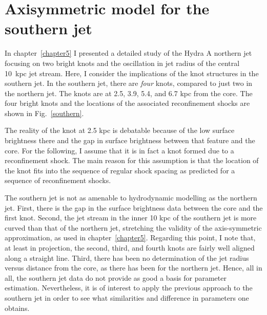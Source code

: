 \chapter{Axisymmetric model for the southern jet}
\label{chapter8}


In chapter~\ref{chapter5} I presented a detailed study of the Hydra A northern jet focusing on two bright knots and the oscillation in jet radius of the central 10~kpc jet stream. Here, I consider the implications of the knot structures in the southern jet. In the southern jet, there are \emph{four} knots, compared to just two in the northern jet. The knots are at 2.5, 3.9, 5.4, and 6.7 kpc from the core. The four bright knots and the locations of the associated reconfinement shocks are shown in Fig.~\ref{southern}.

The reality of the knot at 2.5 kpc is debatable because of the low surface brightness there and the gap in surface brightness between that feature and the core. For the following, I assume that it is in fact a knot formed due to a reconfinement shock. The main reason for this assumption is that the location of the knot fits into the sequence of regular shock spacing as predicted for a sequence of reconfinement shocks.

The southern jet is not as amenable to hydrodynamic modelling as the northern jet. First, there is the gap in the surface brightness data between the core and the first knot. Second, the jet stream in the inner 10 kpc of the southern jet is more curved than that of the northern jet, stretching the validity of the axis-symmetric approximation, as used in chapter~\ref{chapter5}. Regarding this point, I note that, at least in projection, the second, third, and fourth knots are fairly well aligned along a straight line. Third, there has been no determination of the jet radius versus distance from the core, as there has been for the northern jet. Hence, all in all, the southern jet data do not provide as good a basis for parameter estimation. Nevertheless, it is of interest to apply the previous approach to the southern jet in order to see what similarities and difference in parameters one obtains. 

